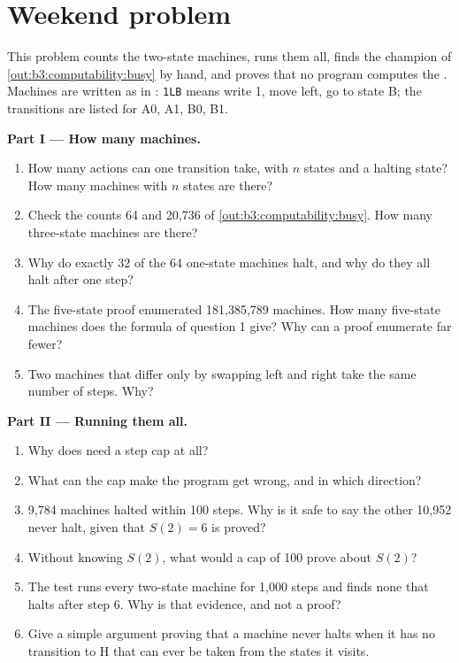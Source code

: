 \section{Weekend problem}\label{sec:b3:computability:problem}

\begin{problem}\label{pb:b3:computability:1}
This problem counts the two-state machines, runs them all, finds the champion of \cref{out:b3:computability:busy} by hand, and proves that no program computes the . Machines are written as in : \texttt{1LB} means write 1, move left, go to state B; the transitions are listed for A0, A1, B0, B1.

\medskip\noindent\textbf{Part I --- How many machines.}
\begin{enumerate}
  \item How many actions can one transition take, with $n$ states and a halting state? How many machines with $n$ states are there?
  \item Check the counts 64 and 20,736 of \cref{out:b3:computability:busy}. How many three-state machines are there?
  \item Why do exactly 32 of the 64 one-state machines halt, and why do they all halt after one step?
  \item The five-state proof enumerated 181,385,789 machines. How many five-state machines does the formula of question 1 give? Why can a proof enumerate far fewer?
  \item Two machines that differ only by swapping left and right take the same number of steps. Why?
\end{enumerate}

\medskip\noindent\textbf{Part II --- Running them all.}
\begin{enumerate}[resume]
  \item Why does  need a step cap at all?
  \item What can the cap make the program get wrong, and in which direction?
  \item 9,784 machines halted within 100 steps. Why is it safe to say the other 10,952 never halt, given that $S(2) = 6$ is proved?
  \item Without knowing $S(2)$, what would a cap of 100 prove about $S(2)$?
  \item The test runs every two-state machine for 1,000 steps and finds none that halts after step 6. Why is that evidence, and not a proof?
  \item Give a simple argument proving that a machine never halts when it has no transition to H that can ever be taken from the states it visits.
\end{enumerate}


\end{problem}
